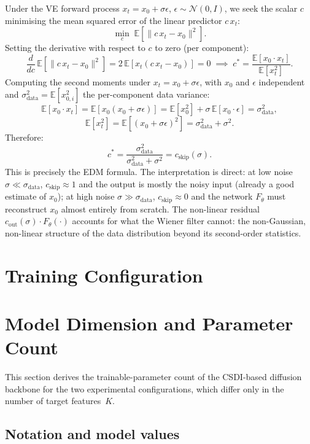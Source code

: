 Under the VE forward process $x_t = x_0 + \sigma\epsilon$,
$\epsilon\sim\mathcal{N}(0,I)$, we seek the scalar $c$ minimising the mean
squared error of the linear predictor $c\,x_t$:
\[
    \min_c\;\mathbb{E}\!\left[\|c\,x_t - x_0\|^2\right].
\]
Setting the derivative with respect to $c$ to zero (per component):
\[
    \frac{d}{dc}\,\mathbb{E}\!\left[\|c\,x_t - x_0\|^2\right]
    = 2\,\mathbb{E}\!\left[x_t(c\,x_t - x_0)\right] = 0
    \;\implies\;
    c^* = \frac{\mathbb{E}[x_0 \cdot x_t]}{\mathbb{E}[x_t^2]}.
\]
Computing the second moments under $x_t = x_0 + \sigma\epsilon$, with $x_0$
and $\epsilon$ independent and $\sigma_{\text{data}}^2 = \mathbb{E}[x_{0,i}^2]$
the per-component data variance:
\[
    \mathbb{E}[x_0 \cdot x_t]
    = \mathbb{E}[x_0(x_0+\sigma\epsilon)]
    = \mathbb{E}[x_0^2] + \sigma\,\mathbb{E}[x_0\cdot\epsilon]
    = \sigma_{\text{data}}^2,
\]
\[
    \mathbb{E}[x_t^2]
    = \mathbb{E}[(x_0+\sigma\epsilon)^2]
    = \sigma_{\text{data}}^2 + \sigma^2.
\]
Therefore:
\[
    c^* = \frac{\sigma_{\text{data}}^2}{\sigma_{\text{data}}^2 + \sigma^2}
    = c_{\text{skip}}(\sigma).
\]
This is precisely the EDM formula. The interpretation is direct: at low noise
$\sigma \ll \sigma_{\text{data}}$, $c_{\text{skip}}\approx 1$ and the output
is mostly the noisy input (already a good estimate of $x_0$); at high noise
$\sigma \gg \sigma_{\text{data}}$, $c_{\text{skip}}\approx 0$ and the network
$F_\theta$ must reconstruct $x_0$ almost entirely from scratch. The non-linear
residual $c_{\text{out}}(\sigma)\cdot F_\theta(\cdot)$ accounts for what the
Wiener filter cannot: the non-Gaussian, non-linear structure of the data
distribution beyond its second-order statistics.


\section{Training Configuration}
\label{app:sec:training_config}

\section{Model Dimension and Parameter Count}
\label{app:model-parameter-count}

This section derives the trainable-parameter count of the CSDI-based diffusion
backbone for the two experimental configurations, which differ only in the
number of target features~$K$.

\subsection{Notation and model values}


